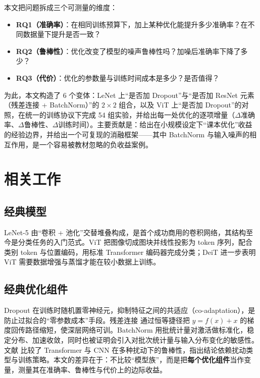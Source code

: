 \documentclass[12pt,hyperref,a4paper,UTF8]{ctexart}
\begin{document}
本文把问题拆成三个可测量的维度：
\begin{itemize}
    \item \textbf{RQ1（准确率）}：在相同训练预算下，加上某种优化能提升多少准确率？在不同数据量下提升是否一致？
    \item \textbf{RQ2（鲁棒性）}：优化改变了模型的噪声鲁棒性吗？加噪后准确率下降了多少？
    \item \textbf{RQ3（代价）}：优化的参数量与训练时间成本是多少？是否值得？
\end{itemize}

为此，本文构造了 6 个变体：LeNet 上“是否加 Dropout”与“是否加 ResNet 元素（残差连接 + BatchNorm）”的 $2\times2$ 组合，以及 ViT 上“是否加 Dropout”的对照，在统一的训练协议下完成 54 组实验，并给出每一处优化的逐项增量（$\Delta$准确率、$\Delta$鲁棒性、$\Delta$训练时间）。主要贡献是：给出在小规模设定下“课本优化”收益的经验边界，并给出一个可复现的消融框架——其中 BatchNorm 与输入噪声的相互作用，是一个容易被教材忽略的负收益案例。

\section{相关工作}

\subsection{经典模型}
LeNet-5\cite{lecun1998gradient} 由“卷积 + 池化”交替堆叠构成，是首个成功商用的卷积网络，其结构至今是分类任务的入门范式。ViT\cite{dosovitskiy2021image} 把图像切成图块并线性投影为 token 序列，配合类别 token 与位置编码，用标准 Transformer 编码器完成分类；DeiT\cite{touvron2021training} 进一步表明 ViT 需要数据增强与蒸馏才能在较小数据上训练。

\subsection{经典优化组件}
Dropout\cite{srivastava2014dropout} 在训练时随机置零神经元，抑制特征之间的共适应（co-adaptation），是防止过拟合的“零参数成本”手段。残差连接\cite{he2016deep} 通过恒等捷径把 $y=f(x)+x$ 的梯度回传路径缩短，使深层网络可训。BatchNorm\cite{ioffe2015batch} 用批统计量对激活做标准化，稳定分布、加速收敛，同时也被证明会引入对批次统计量与输入分布变化的敏感性。文献\cite{bai2021transformers} 比较了 Transformer 与 CNN 在多种扰动下的鲁棒性，指出结论依赖扰动类型与训练策略。本文的差异在于：不比较“模型族”，而是把\textbf{每个优化组件}当作变量，测量其在准确率、鲁棒性与代价上的边际收益。
\end{document}
